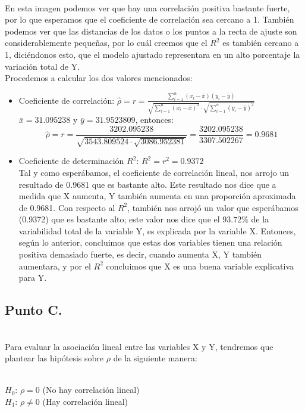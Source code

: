 \documentclass[letterpaper,12pt,onecolumn,titlepage]{article}
\begin{document}
~\\ En esta imagen podemos ver que hay una correlaci\'{o}n positiva bastante fuerte, por lo que esperamos que el coeficiente de correlaci\'{o}n sea cercano a 1. Tambi\'{e}n podemos ver que las distancias de los datos o los puntos a la recta de ajuste son considerablemente peque\~{n}as, por lo cu\'{a}l creemos que el $R^2$ es tambi\'{e}n cercano a 1, dici\'{e}ndonos esto, que el modelo ajustado representara en un alto porcentaje la variaci\'{o}n total de Y.
~\\ Procedemos a calcular los dos valores mencionados:
\begin{itemize}
\item Coeficiente de correlaci\'{o}n: $\hat{\rho}=r=\frac{\sum\limits_{i=1}^{n}(x_{i}-\bar{x})(y_{i}-\bar{y})}{\sqrt{\sum\limits_{i=1}^{n}(x_{i}-\bar{x})^2}\cdot\sqrt{\sum\limits_{i=1}^{n}(y_{i}-\bar{y})^2}}$
~\\ $\bar{x}=31.095238$ y $\bar{y}=31.9523809$, entonces:
~\\ $$\hat{\rho}=r=\frac{3202.095238}{\sqrt{3543.809524\cdot\sqrt{3086.952381}}}=\frac{3202.095238}{3307.502267}=0.9681$$
\item Coeficiente de determinaci\'{o}n $R^2$: $R^2=r^2=0.9372$
~\\ Tal y como esper\'{a}bamos, el coeficiente de correlaci\'{o}n lineal, nos arrojo un resultado de 0.9681 que es bastante alto. Este resultado nos dice que a medida que X aumenta, Y tambi\'{e}n aumenta en una proporci\'{o}n aproximada de 0.9681. Con respecto al $R^2$, tambi\'{e}n nos arroj\'{o} un valor que esper\'{a}bamos (0.9372) que es bastante alto; este valor nos dice que el $93.72\%$ de la variabilidad total de la variable Y, es explicada por la variable X.
Entonces, seg\'{u}n lo anterior, concluimos que estas dos variables tienen una relaci\'{o}n positiva demasiado fuerte, es decir, cuando aumenta X, Y tambi\'{e}n aumentara, y por el $R^2$ concluimos que X es una buena variable explicativa para Y.
\end{itemize} 
\subsection{Punto C.}
~\\ Para evaluar la asociaci\'{o}n lineal entre las variables X y Y, tendremos que plantear las hip\'{o}tesis sobre $\rho$ de la siguiente manera:

~\\ $H_{0}$: $\rho=0$ (No hay correlaci\'{o}n lineal)
~\\ $H_{1}$: $\rho\neq 0$ (Hay correlaci\'{o}n lineal)
\end{document}
